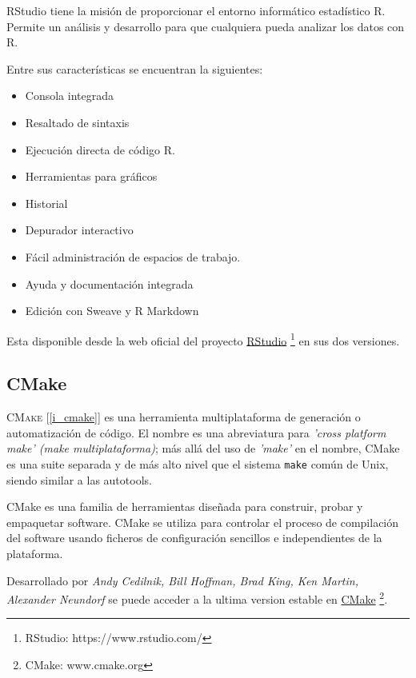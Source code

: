 \documentclass[12pt]{book} %
\begin{document}
		RStudio tiene la misión de proporcionar el entorno informático estadístico R. Permite un análisis y desarrollo para que 
		cualquiera pueda analizar los datos con R.
		
		Entre sus características se encuentran la siguientes:
		\begin{multicols}{2}
			\begin{itemize}
				\item Consola integrada
				\item Resaltado de sintaxis
				\item Ejecución directa de código R.
				\item Herramientas para gráficos
				\item Historial
				\item Depurador interactivo
				\item Fácil administración de espacios de trabajo.
				\item Ayuda y documentación integrada
				\item Edición con Sweave y R Markdown
			\end{itemize}
		\end{multicols} 
		Esta disponible desde la web oficial del proyecto \href{https://www.rstudio.com/}{RStudio} 
		\footnote{\scriptsize RStudio: https://www.rstudio.com/} en sus dos versiones.\\
		
		
	
	\subsection{CMake \label{CM}}
		\textsc{CMake} [\ref{i_cmake}] es una herramienta multiplataforma de generación o automatización de código. El nombre es una abreviatura para 
		\textit{'cross platform make' (make multiplataforma)}; más allá del uso de \textit{'make'} en el nombre, CMake es una suite separada 
		y de más alto nivel que el sistema \texttt{make} común de Unix, siendo similar a las autotools.
		
		CMake es una familia de herramientas diseñada para construir, probar y empaquetar software. CMake se utiliza para controlar el
		proceso de compilación del software usando ficheros de configuración sencillos e independientes de la plataforma. 
		
		Desarrollado por \textit{Andy Cedilnik, Bill Hoffman, Brad King, Ken Martin, Alexander Neundorf} se puede acceder a la ultima 
		version estable en \href{www.cmake.org}{CMake} \footnote{\scriptsize CMake: www.cmake.org}.\\
		
\end{document}

